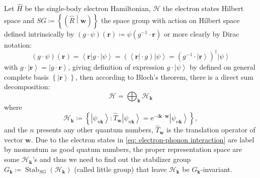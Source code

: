 \documentclass[11pt, reqno]{amsart}
\theoremstyle{definition}
\theoremstyle{remark}
\begin{document}
Let $\hat{H}$ be the single-body electron Hamiltonian, $\mathcal{H}$ the electron states Hilbert space and $SG\coloneqq \left\{ \left(\hat R\middle |\mathbf{w} \right) \right\}$ the space group with action on Hilbert space defined intrinsically by $\left( g\cdot \psi \right) \left( \mathbf{r} \right) \coloneqq \psi \left( g^{-1}\cdot \mathbf{r} \right)$ or more clearly by Dirac notation:
\begin{equation}\label{eq: g acts on psi}
    \left( g\cdot \psi \right) \left( \mathbf{r} \right) =\left< \mathbf{r} \right|g\cdot \left| \psi \right> =\left( \left< \mathbf{r} \right|\cdot g \right) \left| \psi \right> =\left( g^{-1}\cdot \left| \mathbf{r} \right> \right) ^{\dagger}\left| \psi \right>
\end{equation}
with $g\cdot \left| \mathbf{r} \right> =\left| g\cdot \mathbf{r} \right>$, giving definition of expression $g\cdot \left| \psi \right>$ by defined on general complete basis $\left\{ \left| \mathbf{r} \right> \right\}$, then according to Bloch's theorem, there is a direct sum decomposition:
\begin{equation}
    \mathcal{H} =\bigoplus_{\mathbf{k}}{\mathcal{H} _{\mathbf{k}}}
\end{equation}
where
\begin{equation}
    \mathcal{H} _{\mathbf{k}}\coloneqq \left\{ \left| \psi _{n\mathbf{k}} \right> :\hat{T}_{\mathbf{w}}\left| \psi _{n\mathbf{k}} \right> =\mathrm{e}^{-\mathrm{i}\mathbf{k}\cdot \mathbf{w}}\left| \psi _{n\mathbf{k}} \right> \right\} ,
\end{equation}
and the $n$ presents any other quantum numbers, $\hat{T}_{\mathbf{w}}$ is the translation operator of vector $\mathbf{w}$. Due to the electron states in \eqref{eq: electron-phonon interaction} are label by momentum as good quatum numbers, the proper representation space are some $\mathcal{H}_{\mathbf{k}}$'s and thus we need to find out the stabilizer group $G_\mathbf{k}\coloneqq \operatorname{Stab}_{SG}\left(\mathcal{H}_\mathbf{k}\right)$ (called little group) that leave $\mathcal{H}_{\mathbf{k}}$ be $G_\mathbf{k}$-invariant.
\end{document}
